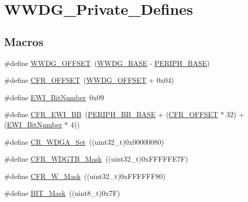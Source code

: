 \hypertarget{group___w_w_d_g___private___defines}{}\section{W\+W\+D\+G\+\_\+\+Private\+\_\+\+Defines}
\label{group___w_w_d_g___private___defines}
\subsection*{Macros}
\begin{DoxyCompactItemize}
\item 
\#define \mbox{\hyperlink{group___w_w_d_g___private___defines_gab6dcdf2385dd7317ec775e146cff40ca}{W\+W\+D\+G\+\_\+\+O\+F\+F\+S\+ET}}~(\mbox{\hyperlink{group___peripheral__memory__map_ga9a5bf4728ab93dea5b569f5b972cbe62}{W\+W\+D\+G\+\_\+\+B\+A\+SE}} -\/ \mbox{\hyperlink{group___peripheral__memory__map_ga9171f49478fa86d932f89e78e73b88b0}{P\+E\+R\+I\+P\+H\+\_\+\+B\+A\+SE}})
\item 
\#define \mbox{\hyperlink{group___w_w_d_g___private___defines_ga3e0f9d9f7f69a6d133bba721e25aca4a}{C\+F\+R\+\_\+\+O\+F\+F\+S\+ET}}~(\mbox{\hyperlink{group___w_w_d_g___private___defines_gab6dcdf2385dd7317ec775e146cff40ca}{W\+W\+D\+G\+\_\+\+O\+F\+F\+S\+ET}} + 0x04)
\item 
\#define \mbox{\hyperlink{group___w_w_d_g___private___defines_ga97c9005823520f5aaefe211923b48215}{E\+W\+I\+\_\+\+Bit\+Number}}~0x09
\item 
\#define \mbox{\hyperlink{group___w_w_d_g___private___defines_gaa48804210cea547f0e0f4ca49c44fc94}{C\+F\+R\+\_\+\+E\+W\+I\+\_\+\+BB}}~(\mbox{\hyperlink{group___peripheral__memory__map_gaed7efc100877000845c236ccdc9e144a}{P\+E\+R\+I\+P\+H\+\_\+\+B\+B\+\_\+\+B\+A\+SE}} + (\mbox{\hyperlink{group___w_w_d_g___private___defines_ga3e0f9d9f7f69a6d133bba721e25aca4a}{C\+F\+R\+\_\+\+O\+F\+F\+S\+ET}} $\ast$ 32) + (\mbox{\hyperlink{group___w_w_d_g___private___defines_ga97c9005823520f5aaefe211923b48215}{E\+W\+I\+\_\+\+Bit\+Number}} $\ast$ 4))
\item 
\#define \mbox{\hyperlink{group___w_w_d_g___private___defines_ga4c66a66daa0e09782e8b2248db9b35f6}{C\+R\+\_\+\+W\+D\+G\+A\+\_\+\+Set}}~((uint32\+\_\+t)0x00000080)
\item 
\#define \mbox{\hyperlink{group___w_w_d_g___private___defines_ga2b74f53d33f15b272b2d1ef78a78a2cc}{C\+F\+R\+\_\+\+W\+D\+G\+T\+B\+\_\+\+Mask}}~((uint32\+\_\+t)0x\+F\+F\+F\+F\+F\+E7\+F)
\item 
\#define \mbox{\hyperlink{group___w_w_d_g___private___defines_gac00816db9fe6715f702b4f7d6085ce30}{C\+F\+R\+\_\+\+W\+\_\+\+Mask}}~((uint32\+\_\+t)0x\+F\+F\+F\+F\+F\+F80)
\item 
\#define \mbox{\hyperlink{group___w_w_d_g___private___defines_ga01a4e07e98e933af78671f65a49bd836}{B\+I\+T\+\_\+\+Mask}}~((uint8\+\_\+t)0x7\+F)
\end{DoxyCompactItemize}


